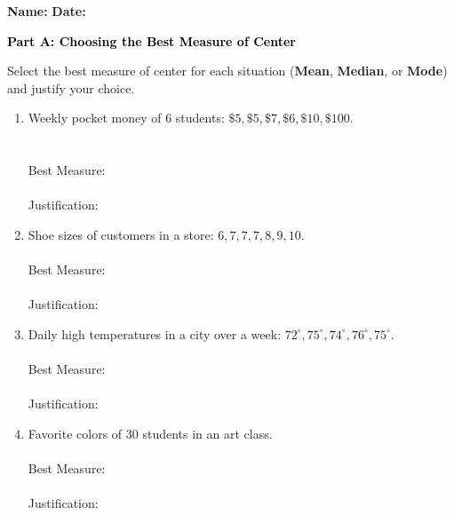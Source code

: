 \documentclass[12pt, letterpaper, fleqn]{article}
\newcommand{\blanklong}{\underline{\hspace{6.5cm}}}
\newcommand{\blankshorter}{\underline{\hspace{1.5cm}}}
\begin{document}
\textbf{Name:} \underline{\hspace{5cm}}
\hfill
\textbf{Date:} \underline{\hspace{3cm}}\\

\begin{tcolorbox}[colback=black!10]
    \large\textcolor{black}{\textbf{Part A: Choosing the Best Measure of Center}}
\end{tcolorbox}

\vspace{3mm}

\noindent
Select the best measure of center for each situation (\textbf{Mean}, \textbf{Median}, or \textbf{Mode}) and justify your choice.

\vspace{5mm}

\begin{enumerate}[itemsep=1.3cm, leftmargin=0.6cm]
\item Weekly pocket money of 6 students: $\$5, \$5, \$7, \$6, \$10, \$100$. \\ \\  \\
Best Measure: \blankshorter \\ \\
Justification: \blanklong

\item Shoe sizes of customers in a store: $6, 7, 7, 7, 8, 9, 10$. \\ \\
Best Measure: \blankshorter \\ \\
Justification: \blanklong

\item Daily high temperatures in a city over a week: $72^\circ, 75^\circ, 74^\circ, 76^\circ, 75^\circ$. \\ \\
Best Measure: \blankshorter \\ \\
Justification: \blanklong

\item Favorite colors of 30 students in an art class. \\ \\
Best Measure: \blankshorter \\ \\
Justification: \blanklong
\end{enumerate}
\end{document}

